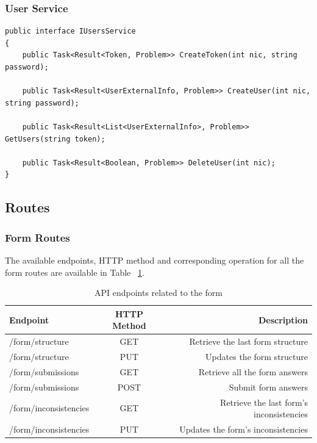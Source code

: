  
\subsubsection{User Service}
 
\begin{lstlisting}[style=sharpc]
public interface IUsersService
{
	public Task<Result<Token, Problem>> CreateToken(int nic, string password);
	
	public Task<Result<UserExternalInfo, Problem>> CreateUser(int nic, string password);
	
	public Task<Result<List<UserExternalInfo>, Problem>> GetUsers(string token);
	
	public Task<Result<Boolean, Problem>> DeleteUser(int nic);
}
\end{lstlisting}
\pagebreak

\subsection{Routes}
\subsubsection{Form Routes}
The available endpoints, HTTP method and corresponding operation for all the form routes are available in Table ~\ref{tab:form_endpoints}. 
	
\begin{table}[h!]
	\begin{center}
		\begin{tabular}{l|c|r} 
			\textbf{Endpoint} & \textbf{HTTP Method} & \textbf{Description}\\
			\hline
			/form/structure & GET & Retrieve the last form structure\\
			\hline
			/form/structure & PUT & Updates the form structure\\
			\hline
			/form/submissions & GET & Retrieve all the form answers\\
			\hline
			/form/submissions & POST & Submit form answers\\
			\hline
			/form/inconsistencies & GET & Retrieve the last form's inconsistencies \\
			\hline
			/form/inconsistencies & PUT & Updates the form's inconsistencies\\
			\hline
		\end{tabular}
		\caption{API endpoints related to the form}\label{tab:form_endpoints}
	\end{center}
\end{table}

